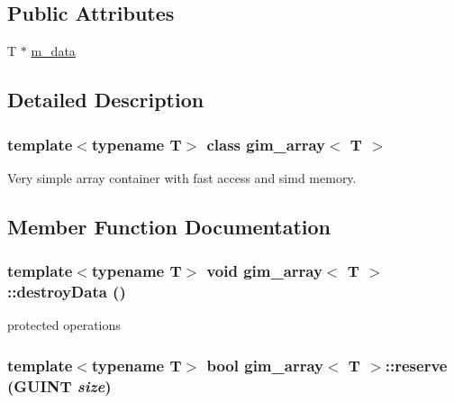 \subsection*{Public Attributes}
\begin{Indent}{\bf }\par
\begin{CompactItemize}
\item 
T $\ast$ \hyperlink{classgim__array_afb886b0fb48bed8c878d8a82dc4099c}{m\_\-data}
\end{CompactItemize}
\end{Indent}


\subsection{Detailed Description}
\subsubsection*{template$<$typename T$>$ class gim\_\-array$<$ T $>$}

Very simple array container with fast access and simd memory. 

\subsection{Member Function Documentation}
\hypertarget{classgim__array_a7a9dca42674415635846cd077cb4a97}{
\subsubsection[destroyData]{\setlength{\rightskip}{0pt plus 5cm}template$<$typename T$>$ void {\bf gim\_\-array}$<$ T $>$::destroyData ()}}
\label{classgim__array_a7a9dca42674415635846cd077cb4a97}


protected operations \hypertarget{classgim__array_572f94b5b67d505335150a2dea8a7e3d}{
\subsubsection[reserve]{\setlength{\rightskip}{0pt plus 5cm}template$<$typename T$>$ bool {\bf gim\_\-array}$<$ T $>$::reserve (GUINT {\em size})}}
\label{classgim__array_572f94b5b67d505335150a2dea8a7e3d}


